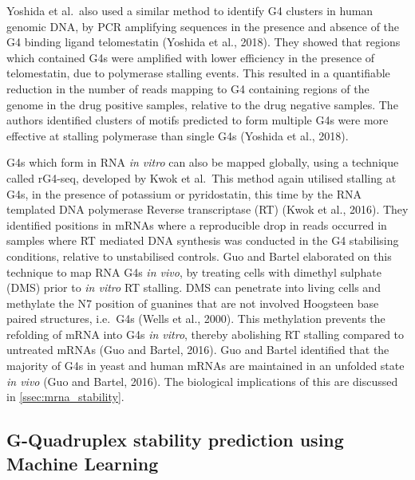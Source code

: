 \documentclass[12pt,a4paper,]{report}
\begin{document}
Yoshida et al.~also used a similar method to identify G4 clusters in
human genomic DNA, by PCR amplifying sequences in the presence and
absence of the G4 binding ligand telomestatin (Yoshida et al., 2018).
They showed that regions which contained G4s were amplified with lower
efficiency in the presence of telomestatin, due to polymerase stalling
events. This resulted in a quantifiable reduction in the number of reads
mapping to G4 containing regions of the genome in the drug positive
samples, relative to the drug negative samples. The authors identified
clusters of motifs predicted to form multiple G4s were more effective at
stalling polymerase than single G4s (Yoshida et al., 2018).

G4s which form in RNA \emph{in vitro} can also be mapped globally, using
a technique called rG4-seq, developed by Kwok et al.~This method again
utilised stalling at G4s, in the presence of potassium or pyridostatin,
this time by the RNA templated DNA polymerase Reverse transcriptase (RT)
(Kwok et al., 2016). They identified positions in mRNAs where a
reproducible drop in reads occurred in samples where RT mediated DNA
synthesis was conducted in the G4 stabilising conditions, relative to
unstabilised controls. Guo and Bartel elaborated on this technique to
map RNA G4s \emph{in vivo}, by treating cells with dimethyl sulphate
(DMS) prior to \emph{in vitro} RT stalling. DMS can penetrate into
living cells and methylate the N7 position of guanines that are not
involved Hoogsteen base paired structures, i.e.~G4s (Wells et al.,
2000). This methylation prevents the refolding of mRNA into G4s \emph{in
vitro}, thereby abolishing RT stalling compared to untreated mRNAs (Guo
and Bartel, 2016). Guo and Bartel identified that the majority of G4s in
yeast and human mRNAs are maintained in an unfolded state \emph{in vivo}
(Guo and Bartel, 2016). The biological implications of this are
discussed in \autoref{ssec:mrna_stability}.

\hypertarget{g-quadruplex-stability-prediction-using-machine-learning}{%
\subsection{G-Quadruplex stability prediction using Machine
Learning}\label{g-quadruplex-stability-prediction-using-machine-learning}}

\label{ssec:g4_machine_learning}
\end{document}
